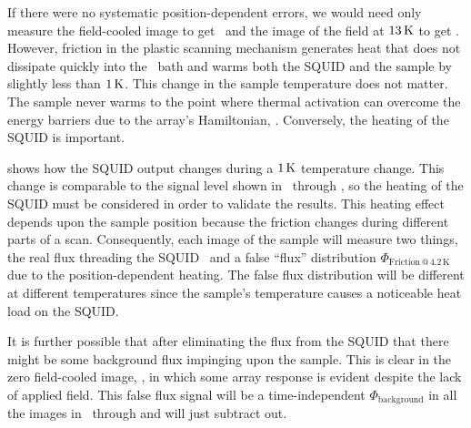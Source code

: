 If there were no systematic position-dependent errors,
we would need only measure the field-cooled image to 
get \Phitot\ and the image of the field at $13\,\kelvin$ to get \Phiext.
However,
friction in the plastic scanning mechanism generates heat that  
does not dissipate
quickly into the \lhe\ bath and
warms both the SQUID and the sample by slightly less than $1\,\kelvin$. 
This change in the sample temperature
does not matter. The sample never
warms to the point where thermal activation can overcome the energy
barriers due to the array's Hamiltonian, . 
Conversely, the heating of the SQUID is important.
 
 shows how the SQUID output changes 
during a $1\,\kelvin$ temperature change. This change is comparable to the
signal level shown 
in \ through
, so the heating of the SQUID must be
considered in order to validate the results. 
This heating effect depends upon the
sample position because the friction changes during different parts of a
scan. Consequently, each image of the sample will
measure two things, the real flux threading the SQUID \Phitot\
and a false
``flux'' distribution $\Phi_\mathrm{Friction\,@\,4.2\,K}$ 
due to the position-dependent heating.
The false flux distribution will be
different at different temperatures since
the 
sample's 
temperature causes a noticeable heat load
on the SQUID.  

It is further possible that after eliminating the flux from the SQUID
that there might be some background flux impinging upon the sample. 
This is clear in the zero field-cooled image, 
, in which some array response
is evident despite the lack of applied field. This false flux
signal
will be a time-independent $\Phi_\mathrm{background}$ in all the images in
\FigRef{fig:pme_scanning_passes_a}\ through
 and will just subtract out. 

